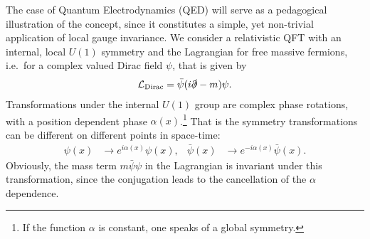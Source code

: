 \label{sec:qedu1}
\label{sec:ymlagrang}
The case of Quantum Electrodynamics (QED) will serve as a
pedagogical illustration of the concept, since it constitutes a
simple, yet non-trivial application of local gauge invariance. We consider a relativistic QFT with an internal, local $U(1)$ symmetry and
the Lagrangian for free massive fermions, i.e.~for a complex valued Dirac field
$\psi$, that is given by
\begin{align}
  \mathcal{L}_{\text{Dirac}} = \bar{\psi}(i\slashed{\partial}-m)\psi.\label{eq:diraclag}
\end{align}
Transformations under the internal $U(1)$ group are complex phase
rotations, with a position dependent phase $\alpha(x)$.\footnote{If the
function $\alpha$ is constant, one speaks of a global symmetry.} That is the
symmetry transformations can be different on different points in space-time:
\begin{align}\label{eq:diractrafo}
  \psi(x) &\rightarrow e^{i\alpha(x)}\psi(x),&  \bar{\psi}(x) &\rightarrow e^{-i\alpha(x)}\bar{\psi}(x).
\end{align}
Obviously, the mass term $m\bar{\psi}\psi$ in
the Lagrangian is invariant under this transformation, since the conjugation leads to
the cancellation of the $\alpha$ dependence.


